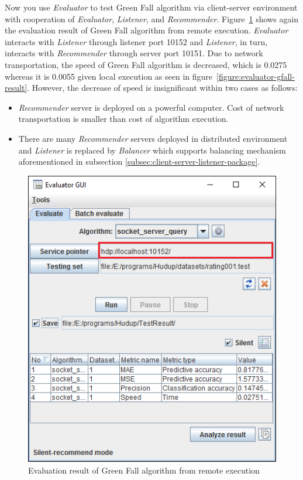 \documentclass[a4paper,twoside]{article}
\begin{document}
Now you use \textit{Evaluator} to test Green Fall algorithm via client-server environment with cooperation of \textit{Evaluator}, \textit{Listener}, and \textit{Recommender}. Figure~\ref{figure:evaluator-gfall-result-remote} shows again the evaluation result of Green Fall algorithm from remote execution. \textit{Evaluator} interacts with \textit{Listener} through listener port 10152 and \textit{Listener}, in turn, interacts with \textit{Recommender} through server port 10151. Due to network transportation, the speed of Green Fall algorithm is decreased, which is 0.0275 whereas it is 0.0055 given local execution as seen in figure~\ref{figure:evaluator-gfall-result}. However, the decrease of speed is insignificant within two cases as follows:
\begin{itemize}
\item \textit{Recommender} server is deployed on a powerful computer. Cost of network transportation is smaller than cost of algorithm execution.
\item There are many \textit{Recommender} servers deployed in distributed environment and \textit{Listener} is replaced by \textit{Balancer} which supports balancing mechanism aforementioned in subsection \ref{subsec:client-server-listener-package}.
\end{itemize}
\begin{figure}
\centering
\includegraphics{EvaluatorGreenFallResultRemote.png}
\caption{Evaluation result of Green Fall algorithm from remote execution}
\label{figure:evaluator-gfall-result-remote}
\end{figure}
\end{document}
